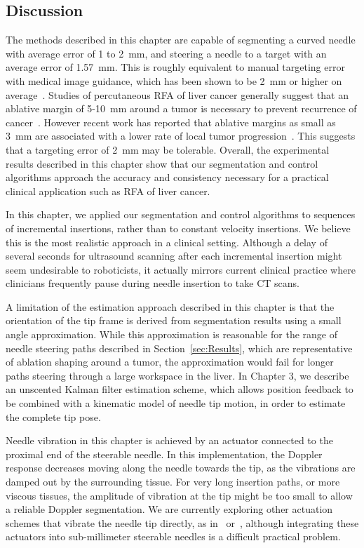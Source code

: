 \subsection{Discussion}
The methods described in this chapter are capable of segmenting a curved needle with average error of 1 to 2~mm, and steering a needle to a target with an average error of 1.57~mm. This is roughly equivalent to manual targeting error with medical image guidance, which has been shown to be 2~mm or higher on average~\cite{Crocetti2008,MaierHein2008,Schubert2013}. Studies of percutaneous RFA of liver cancer generally suggest that an ablative margin of 5-10~mm around a tumor is necessary to prevent recurrence of cancer~\cite{Dodd2001,Kim2006,Gervais2009}. However recent work has reported that ablative margins as small as 3~mm are associated with a lower rate of local tumor progression~\cite{Kim2010}. This suggests that a targeting error of 2~mm may be tolerable. Overall, the experimental results described in this chapter show that our segmentation and control algorithms approach the accuracy and consistency necessary for a practical clinical application such as RFA of liver cancer. 

In this chapter, we applied our segmentation and control algorithms to sequences of incremental insertions, rather than to constant velocity insertions. We believe this is the most realistic approach in a clinical setting. Although a delay of several seconds for ultrasound scanning after each incremental insertion might seem undesirable to roboticists, it actually mirrors current clinical practice where clinicians frequently pause during needle insertion to take CT scans. 

A limitation of the estimation approach described in this chapter is that the orientation of the tip frame is derived from segmentation results using a small angle approximation. While this approximation is reasonable for the range of needle steering paths described in Section~\ref{sec:Results}, which are representative of ablation shaping around a tumor, the approximation would fail for longer paths steering through a large workspace in the liver. In Chapter 3, we describe an unscented Kalman filter estimation scheme, which allows position feedback to be combined with a kinematic model of needle tip motion, in order to estimate the complete tip pose.

Needle vibration in this chapter is achieved by an actuator connected to the proximal end of the steerable needle. In this implementation, the Doppler response decreases moving along the needle towards the tip, as the vibrations are damped out by the surrounding tissue. For very long insertion paths, or more viscous tissues, the amplitude of vibration at the tip might be too small to allow a reliable Doppler segmentation. We are currently exploring other actuation schemes that vibrate the needle tip directly, as in~\cite{Harmat2006} or~\cite{McAleavey2003}, although integrating these actuators into sub-millimeter steerable needles is a difficult practical problem.

